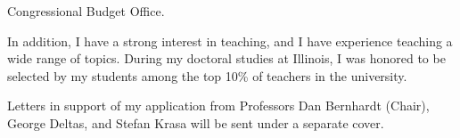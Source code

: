 \documentclass[12pt]{letter}
\begin{document}
\begin{letter}{Congressional Budget Office.}





In addition, I have a strong interest in teaching, and I have experience teaching a wide range of topics.
During my doctoral studies at Illinois, I was honored to be selected by my students among the top 10\% of teachers in the university.


Letters in support of my application from Professors Dan Bernhardt (Chair), George Deltas, and Stefan Krasa will be sent under a separate cover. 


\end{letter}
\end{document}
